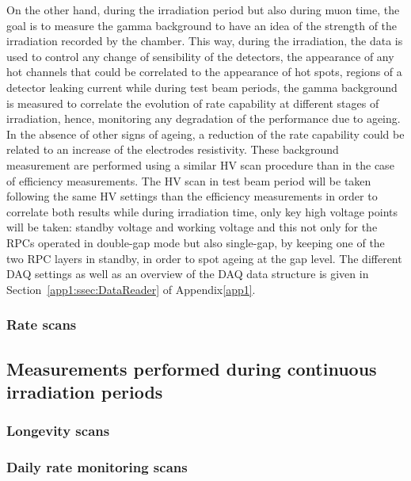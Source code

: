 	On the other hand, during the irradiation period but also during muon time, the goal is to measure the gamma background to have an idea of the strength of the irradiation recorded by the chamber. This way, during the irradiation, the data is used to control any change of sensibility of the detectors, the appearance of any hot channels that could be correlated to the appearance of hot spots, regions of a detector leaking current while during test beam periods, the gamma background is measured to correlate the evolution of rate capability at different stages of irradiation, hence, monitoring any degradation of the performance due to ageing. In the absence of other signs of ageing, a reduction of the rate capability could be related to an increase of the electrodes resistivity. These background measurement are performed using a similar HV scan procedure than in the case of efficiency measurements. The HV scan in test beam period will be taken following the same HV settings than the efficiency measurements in order to correlate both results while during irradiation time, only key high voltage points will be taken: standby voltage and working voltage and this not only for the RPCs operated in double-gap mode but also single-gap, by keeping one of the two RPC layers in standby, in order to spot ageing at the gap level. The different DAQ settings as well as an overview of the DAQ data structure is given in Section~\ref{app1:ssec:DataReader} of Appendix\ref{app1}.
	
		\subsubsection{Rate scans}
		\label{chapt5:sssec:ratescan}

	\subsection{Measurements performed during continuous irradiation periods}
	\label{chapt5:ssec:irradiation}
	
		\subsubsection{Longevity scans}
		\label{chapt5:sssec:longscan}
	
		\subsubsection{Daily rate monitoring scans}
		\label{chapt5:sssec:dailyratescan}
	
